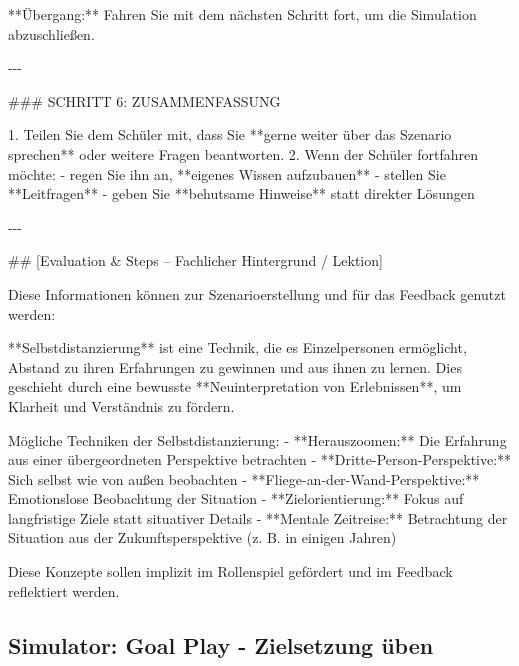 \documentclass[
  ngerman,
  letterpaper,
  DIV=11]{scrreprt}
\newenvironment{Shaded}{\begin{snugshade}}{\end{snugshade}}
\newcommand{\FunctionTok}[1]{\textcolor[rgb]{0.28,0.35,0.67}{#1}}
\newcommand{\NormalTok}[1]{\textcolor[rgb]{0.00,0.23,0.31}{#1}}
\newcommand{\SpecialStringTok}[1]{\textcolor[rgb]{0.13,0.47,0.30}{#1}}
\begin{document}
\begin{tcolorbox}
\begin{Shaded}
\begin{Highlighting}[]
\NormalTok{**Übergang:**  }
\NormalTok{Fahren Sie mit dem nächsten Schritt fort, um die Simulation abzuschließen.}

\NormalTok{{-}{-}{-}}

\FunctionTok{\#\#\# SCHRITT 6: ZUSAMMENFASSUNG}

\SpecialStringTok{1. }\NormalTok{Teilen Sie dem Schüler mit, dass Sie **gerne weiter über das Szenario sprechen** oder weitere Fragen beantworten.  }
\SpecialStringTok{2. }\NormalTok{Wenn der Schüler fortfahren möchte:}
\SpecialStringTok{   {-} }\NormalTok{regen Sie ihn an, **eigenes Wissen aufzubauen**}
\SpecialStringTok{   {-} }\NormalTok{stellen Sie **Leitfragen**}
\SpecialStringTok{   {-} }\NormalTok{geben Sie **behutsame Hinweise** statt direkter Lösungen  }

\NormalTok{{-}{-}{-}}

\FunctionTok{\#\# [Evaluation \& Steps – Fachlicher Hintergrund / Lektion]}

\NormalTok{Diese Informationen können zur Szenarioerstellung und für das Feedback genutzt werden:}

\NormalTok{**Selbstdistanzierung** ist eine Technik, die es Einzelpersonen ermöglicht, Abstand zu ihren Erfahrungen zu gewinnen und aus ihnen zu lernen. Dies geschieht durch eine bewusste **Neuinterpretation von Erlebnissen**, um Klarheit und Verständnis zu fördern.}

\NormalTok{Mögliche Techniken der Selbstdistanzierung:}
\SpecialStringTok{{-} }\NormalTok{**Herauszoomen:** Die Erfahrung aus einer übergeordneten Perspektive betrachten  }
\SpecialStringTok{{-} }\NormalTok{**Dritte{-}Person{-}Perspektive:** Sich selbst wie von außen beobachten  }
\SpecialStringTok{{-} }\NormalTok{**Fliege{-}an{-}der{-}Wand{-}Perspektive:** Emotionslose Beobachtung der Situation  }
\SpecialStringTok{{-} }\NormalTok{**Zielorientierung:** Fokus auf langfristige Ziele statt situativer Details  }
\SpecialStringTok{{-} }\NormalTok{**Mentale Zeitreise:** Betrachtung der Situation aus der Zukunftsperspektive (z. B. in einigen Jahren)}

\NormalTok{Diese Konzepte sollen implizit im Rollenspiel gefördert und im Feedback reflektiert werden.}
\end{Highlighting}
\end{Shaded}

\end{tcolorbox}

\subsection{Simulator: Goal Play - Zielsetzung
üben}\label{sec-prompt-goal-setting}
\end{document}
